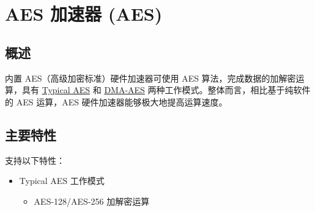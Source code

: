 \documentclass[main\_\_CN.tex]{subfiles}
\begin{document}

\ifglobal
\else
    {\let\clearpage\relax \listoftodos}
    {\let\clearpage\relax \listofdonetodos}
    \tableofcontents
\fi



\hypertarget{aes}{}
\chapter{AES 加速器 (AES)}\label{mod:aes}

\section{概述}

\chipname{} 内置 AES（高级加密标准）硬件加速器可使用 AES 算法，完成数据的加解密运算，具有 \hyperref[sec:aes-typical-modes]{Typical AES} 和 \hyperref[sec:aes-dma-aes]{DMA-AES} 两种工作模式。整体而言，相比基于纯软件的 AES 运算，AES 硬件加速器能够极大地提高运算速度。

\section{主要特性}

\chipname{} 支持以下特性：
\begin{itemize}
    \item Typical AES 工作模式
        \begin{itemize}
            \item AES-128/AES-256 加解密运算
        \end{itemize}
    \end{itemize}
\end{document}
